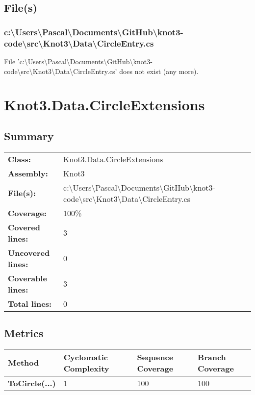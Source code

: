 \documentclass[a4paper,10pt]{article}
\begin{document}
\subsection{File(s)}
\subsubsection{c:\textbackslash Users\textbackslash Pascal\textbackslash Documents\textbackslash GitHub\textbackslash knot3-code\textbackslash src\textbackslash Knot3\textbackslash Data\textbackslash CircleEntry.cs}
 File 'c:\textbackslash Users\textbackslash Pascal\textbackslash Documents\textbackslash GitHub\textbackslash knot3-code\textbackslash src\textbackslash Knot3\textbackslash Data\textbackslash CircleEntry.cs' does not exist (any more).
\newpage
\section{Knot3.Data.CircleExtensions}
\subsection{Summary}
\begin{longtable}[l]{ll}
\textbf{Class:} & Knot3.Data.CircleExtensions\\
\textbf{Assembly:} & Knot3\\
\textbf{File(s):} & \begin{minipage}[t]{12cm}{c:\textbackslash Users\textbackslash Pascal\textbackslash Documents\textbackslash GitHub\textbackslash knot3-code\textbackslash src\textbackslash Knot3\textbackslash Data\textbackslash CircleEntry.cs}\end{minipage} \\
\textbf{Coverage:} & 100\%\\
\textbf{Covered lines:} & 3\\
\textbf{Uncovered lines:} & 0\\
\textbf{Coverable lines:} & 3\\
\textbf{Total lines:} & 0\\
\end{longtable}
\subsection{Metrics}
\begin{longtable}[l]{|l|l|l|l|}
\hline
\textbf{Method} & \textbf{Cyclomatic Complexity} & \textbf{Sequence Coverage} & \textbf{Branch Coverage}\\
\hline
\textbf{ToCircle(...)} & 1 & 100 & 100\\
\hline
\end{longtable}
\end{document}
